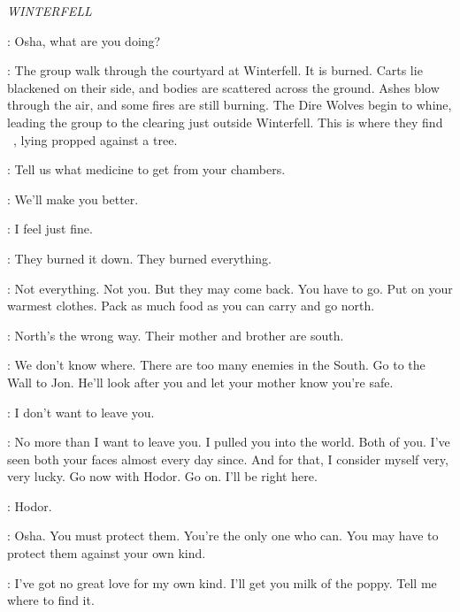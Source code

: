 

\scene



\textit{WINTERFELL} 


\BRAN: Osha, what are you doing? 

\NARRATOR: The group walk through the courtyard at Winterfell. It is burned. Carts lie blackened on their side, and bodies are scattered across the ground. Ashes blow through the air, and some fires are still burning. The Dire Wolves begin to whine, leading the group to the clearing just outside Winterfell. This is where they find \LUWIN ~, lying propped against a tree.


\BRAN: Tell us what medicine to get from your chambers. 

\RICKON: We'll make you better. 

\LUWIN: I feel just fine. 

\BRAN: They burned it down. They burned everything. 

\LUWIN: Not everything. Not you. But they may come back. You have to go. Put on your warmest clothes. Pack as much food as you can carry and go north. 

\OSHA: North's the wrong way. Their mother and brother are south. 

\LUWIN: We don't know where. There are too many enemies in the South. Go to the Wall to Jon. He'll look after you and let your mother know you're safe. 

\BRAN: I don't want to leave you. 

\LUWIN: No more than I want to leave you.  I pulled you into the world. Both of you.  I've seen both your faces almost every day since. And for that, I consider myself very, very lucky. Go now with Hodor. Go on. I'll be right here. 

\HODOR:  Hodor. 


\LUWIN: Osha.  You must protect them. You're the only one who can. You may have to protect them against your own kind. 

\OSHA: I've got no great love for my own kind. I'll get you milk of the poppy. Tell me where to find it. 

